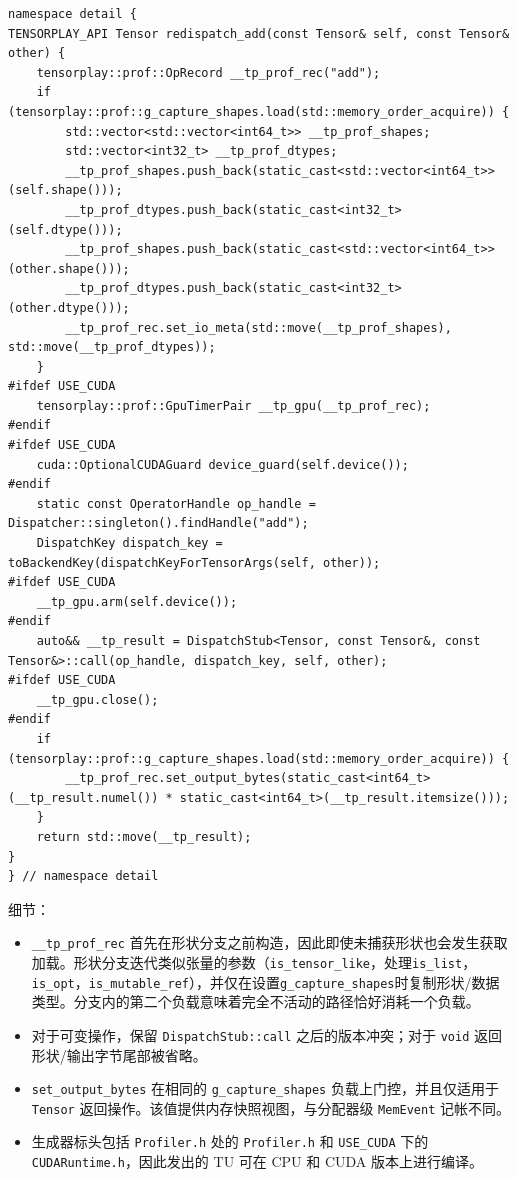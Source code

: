\begin{lstlisting}[caption={redispatch instrumentation.}, label=lst:genredispatch, style=cppstyle]
namespace detail {
TENSORPLAY_API Tensor redispatch_add(const Tensor& self, const Tensor& other) {
    tensorplay::prof::OpRecord __tp_prof_rec("add");
    if (tensorplay::prof::g_capture_shapes.load(std::memory_order_acquire)) {
        std::vector<std::vector<int64_t>> __tp_prof_shapes;
        std::vector<int32_t> __tp_prof_dtypes;
        __tp_prof_shapes.push_back(static_cast<std::vector<int64_t>>(self.shape()));
        __tp_prof_dtypes.push_back(static_cast<int32_t>(self.dtype()));
        __tp_prof_shapes.push_back(static_cast<std::vector<int64_t>>(other.shape()));
        __tp_prof_dtypes.push_back(static_cast<int32_t>(other.dtype()));
        __tp_prof_rec.set_io_meta(std::move(__tp_prof_shapes), std::move(__tp_prof_dtypes));
    }
#ifdef USE_CUDA
    tensorplay::prof::GpuTimerPair __tp_gpu(__tp_prof_rec);
#endif
#ifdef USE_CUDA
    cuda::OptionalCUDAGuard device_guard(self.device());
#endif
    static const OperatorHandle op_handle = Dispatcher::singleton().findHandle("add");
    DispatchKey dispatch_key = toBackendKey(dispatchKeyForTensorArgs(self, other));
#ifdef USE_CUDA
    __tp_gpu.arm(self.device());
#endif
    auto&& __tp_result = DispatchStub<Tensor, const Tensor&, const Tensor&>::call(op_handle, dispatch_key, self, other);
#ifdef USE_CUDA
    __tp_gpu.close();
#endif
    if (tensorplay::prof::g_capture_shapes.load(std::memory_order_acquire)) {
        __tp_prof_rec.set_output_bytes(static_cast<int64_t>(__tp_result.numel()) * static_cast<int64_t>(__tp_result.itemsize()));
    }
    return std::move(__tp_result);
}
} // namespace detail
\end{lstlisting}

细节：

\begin{itemize}[leftmargin=1.4em]
\item \texttt{\_\_tp\_prof\_rec} 首先在形状分支之前构造，因此即使未捕获形状也会发生获取加载。形状分支迭代类似张量的参数（\texttt{is\_tensor\_like}，处理\texttt{is\_list}，\texttt{is\_opt}，\texttt{is\_mutable\_ref}），并仅在设置\texttt{g\_capture\_shapes}时复制形状/数据类型。分支内的第二个负载意味着完全不活动的路径恰好消耗一个负载。
\item 对于可变操作，保留 \texttt{DispatchStub::call} 之后的版本冲突；对于 \texttt{void} 返回形状/输出字节尾部被省略。
\item \texttt{set\_output\_bytes} 在相同的 \texttt{g\_capture\_shapes} 负载上门控，并且仅适用于 \texttt{Tensor} 返回操作。该值提供内存快照视图，与分配器级 \texttt{MemEvent} 记帐不同。
\item 生成器标头包括 \texttt{Profiler.h} 处的 \texttt{Profiler.h} 和 \texttt{USE\_CUDA} 下的 \texttt{CUDARuntime.h}，因此发出的 TU 可在 CPU 和 CUDA 版本上进行编译。
\end{itemize}


